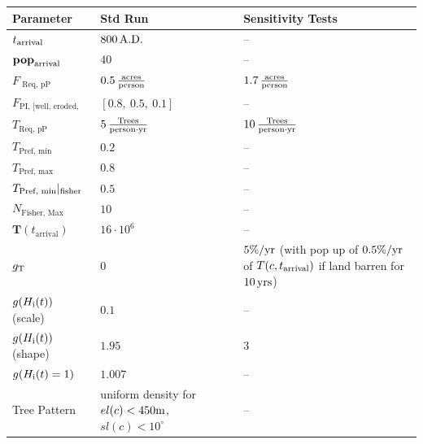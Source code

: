 \begin{table}
	\begin{tabular}{l|L|K}
		Parameter &  Std Run & Sensitivity Tests \\ \hline
		$t_{\rm arrival}$ & $800\, {\rm A.D.}$ & --\\
		$\mathbf{pop}_{\rm arrival}$ & $40$ & --\\ \hline
		 $F_\text{ Req, pP}$ & $0.5\, {\rm \frac{acres}{person}}$ &  $1.7\, {\rm \frac{acres}{person}}$ \\
		 $F_\text{PI, [well, eroded, poor]}$ & $[0.8,\ 0.5,\ 0.1]$ & -- \\
		 $T_\text{Req, pP}$ & $5\, {\rm \frac{Trees}{person\cdot yr}}$ & $10\, {\rm \frac{Trees}{person\cdot yr}}$  \\
		  $T_\text{Pref, min}$ & $0.2$ & -- \\
		  $T_\text{Pref, max}$ & $0.8$ & --\\
		  $T_\text{Pref, min}|_{\rm fisher}$ & $0.5$ & --\\
		  $N_\text{Fisher, Max}$ & $10$ & -- \\ \hline
		  $\mathbf{T}(t_\text{arrival})$ & $16\cdot10^6$ & -- \\
		  $g_{\rm T}$ & $0$ & $5\%/{\rm yr}$ (with pop up of $0.5\%/{\rm yr}$ of $T(c,t_{\rm arrival})$ if land barren for $10\, {\rm yrs}$) \\
		  \hline
		  $g(H_{\rm i}(t))$ (scale) & $0.1$ & --\\
		  $g(H_{\rm i}(t))$ (shape) & $1.95$ & $3$ \\
		  $g(H_{\rm i}(t)=1)$ & $1.007$ & -- \\ \hline
		   Tree Pattern & uniform density for $el(c)<450{\rm m}$, $sl(c)<10^\circ$ & -- \\ \hline

\end{tabular}
\end{table}
